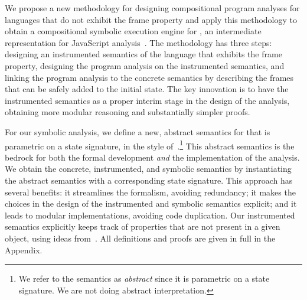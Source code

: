 
We propose a new methodology for designing compositional program analyses for languages that do not exhibit the frame property and apply this methodology to obtain a compositional symbolic execution engine for \jsil, an intermediate representation for JavaScript analysis~\cite{javert}. 
%
%
The methodology has three steps:  designing an instrumented semantics of the language that exhibits the frame property,  designing the program  analysis on the instrumented semantics, and  linking the program analysis to the concrete semantics by describing the frames that can be safely added to the initial state.   
%
The key innovation is to have the instrumented semantics as a proper interim stage in the design of the analysis, obtaining 
more modular reasoning and substantially simpler proofs.

For our symbolic analysis, we define a new, abstract semantics for \jsil that is parametric on a \jsil state signature, in the style of~\citet{vanhorn:icfp:2010}.\footnote{We refer to the semantics as \emph{abstract} since it 
is parametric on a \jsil state signature. We are not doing abstract interpretation.} 
This abstract semantics is the bedrock for both the formal development \emph{and} the implementation of the analysis. 
We obtain the concrete, instrumented, and symbolic semantics by instantiating 
the abstract semantics with a corresponding state signature. 
This approach has several benefits: it streamlines the formalism, avoiding redundancy; it makes the choices in the design of the instrumented and symbolic semantics explicit; and it leads to modular implementations, avoiding code duplication.
%
Our instrumented semantics explicitly keeps track of properties that are not present in a given object, using ideas from~\cite{gardner:popl:2012,javert}. All definitions and proofs are given in full in the Appendix.


